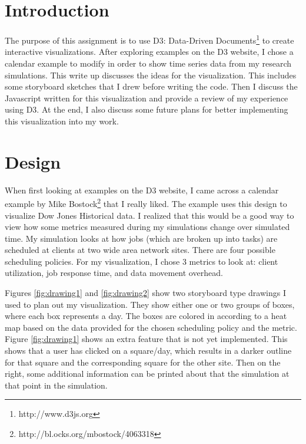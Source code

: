 \documentclass[11pt]{article}
\numberwithin{figure}{section}
\begin{document}
\maketitle
\section{Introduction}
The purpose of this assignment is to use D3: Data-Driven Documents\footnote{http://www.d3js.org} to create interactive visualizations.  After exploring examples on the D3 website, I chose a calendar example to modify in order to show time series data from my research simulations.  This write up discusses the ideas for the visualization.  This includes some storyboard sketches that I drew before writing the code. Then I discuss the Javascript written for this visualization and provide a review of my experience using D3.  At the end, I also discuss some future plans for better implementing this visualization into my work.

\section{Design}
When first looking at examples on the D3 website, I came across a calendar example by Mike Bostock\footnote{http://bl.ocks.org/mbostock/4063318} that I really liked.  The example uses this design to visualize Dow Jones Historical data.  I realized that this would be a good way to view how some metrics measured during my simulations change over simulated time.  My simulation looks at how jobs (which are broken up into tasks) are scheduled at clients at two wide area network sites.  There are four possible scheduling policies.  For my visualization, I chose 3 metrics to look at: client utilization, job response time, and data movement overhead.  

Figures \ref{fig:drawing1} and \ref{fig:drawing2} show two storyboard type drawings I used to plan out my visualization.  They show either one or two groups of boxes, where each box represents a day.  The boxes are colored in according to a heat map based on the data provided for the chosen scheduling policy and the metric.  Figure \ref{fig:drawing1} shows an extra feature that is not yet implemented.  This shows that a user has clicked on a square/day, which results in a darker outline for that square and the corresponding square for the other site.  Then on the right, some additional information can be printed about that the simulation at that point in the simulation.
\end{document}
